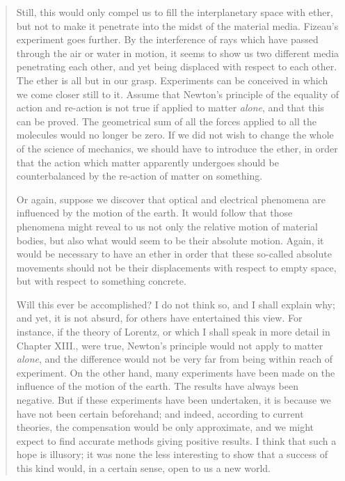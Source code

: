 \documentclass{article}
\begin{document}
\begin{quote}
     Still, this would only compel us to fill the interplanetary space with ether, but not to make it penetrate into the midst of the material media.  Fizeau's experiment goes further.  By the interference of rays which have passed through the air or water in motion, it seems to show us two different media penetrating each other, and yet being displaced with respect to each other.  The ether is all but in our grasp.  Experiments can be conceived in which we come closer still to it.  Assume that Newton's principle of the equality of action and re-action is not true if applied to matter \emph{alone}, and that this can be proved.  The geometrical sum of all the forces applied to all the molecules would no longer be zero.  If we did not wish to change the whole of the science of mechanics, we should have to introduce the ether, in order that the action which matter apparently undergoes should be counterbalanced by the re-action of matter on something.
     
     Or again, suppose we discover that optical and electrical phenomena are influenced by the motion of the earth.  It would follow that those phenomena might reveal to us not only the relative motion of material bodies, but also what would seem to be their absolute motion.  Again, it would be necessary to have an ether in order that these so-called absolute movements should not be their displacements with respect to empty space, but with respect to something concrete.  
     
     Will this ever be accomplished?  I do not think so, and I shall explain why; and yet, it is not absurd, for others have entertained this view.  For instance, if the theory of Lorentz, or which I shall speak in more detail in Chapter XIII., were true, Newton's principle would not apply to matter \emph{alone}, and the difference would not be very far from being within reach of experiment.  On the other hand, many experiments have been made on the influence of the motion of the earth.  The results have always been negative.  But if these experiments have been undertaken, it is because we have not been certain beforehand; and indeed, according to current theories, the compensation would be only approximate, and we might expect to find accurate methods giving positive results.  I think that such a hope is illusory; it was none the less interesting to show that a success of this kind would, in a certain sense, open to us a new world.
     

\end{quote}
\end{document}
